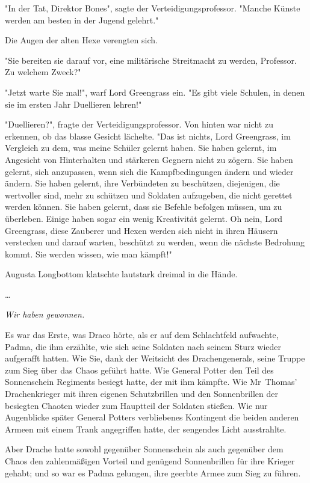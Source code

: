 {"In der Tat, Direktor Bones", sagte der Verteidigungsprofessor. "Manche Künste werden am besten in der Jugend gelehrt."

Die Augen der alten Hexe verengten sich.

"Sie bereiten sie darauf vor, eine militärische Streitmacht zu werden, Professor. Zu welchem Zweck?"

"Jetzt warte Sie mal!", warf Lord Greengrass ein. "Es gibt viele Schulen, in denen sie im ersten Jahr Duellieren lehren!"

"Duellieren?", fragte der Verteidigungsprofessor. Von hinten war nicht zu erkennen, ob das blasse Gesicht lächelte. "Das ist nichts, Lord Greengrass, im Vergleich zu dem, was meine Schüler gelernt haben. Sie haben gelernt, im Angesicht von Hinterhalten und stärkeren Gegnern nicht zu zögern. Sie haben gelernt, sich anzupassen, wenn sich die Kampfbedingungen ändern und wieder ändern. Sie haben gelernt, ihre Verbündeten zu beschützen, diejenigen, die wertvoller sind, mehr zu schützen und Soldaten aufzugeben, die nicht gerettet werden können. Sie haben gelernt, dass sie Befehle befolgen müssen, um zu überleben. Einige haben sogar ein wenig Kreativität gelernt. Oh nein, Lord Greengrass, diese Zauberer und Hexen werden sich nicht in ihren Häusern verstecken und darauf warten, beschützt zu werden, wenn die nächste Bedrohung kommt. Sie werden wissen, wie man kämpft!"

Augusta Longbottom klatschte lautstark dreimal in die Hände.

…

\emph{Wir haben gewonnen.}

Es war das Erste, was Draco hörte, als er auf dem Schlachtfeld aufwachte, Padma, die ihm erzählte, wie sich seine Soldaten nach seinem Sturz wieder aufgerafft hatten. Wie Sie, dank der Weitsicht des Drachengenerals, seine Truppe zum Sieg über das Chaos geführt hatte. Wie General Potter den Teil des Sonnenschein Regiments besiegt hatte, der mit ihm kämpfte. Wie Mr~Thomas' Drachenkrieger mit ihren eigenen Schutzbrillen und den Sonnenbrillen der besiegten Chaoten wieder zum Hauptteil der Soldaten stießen. Wie nur Augenblicke später General Potters verbliebenes Kontingent die beiden anderen Armeen mit einem Trank angegriffen hatte, der sengendes Licht ausstrahlte.

Aber Drache hatte sowohl gegenüber Sonnenschein als auch gegenüber dem Chaos den zahlenmäßigen Vorteil und genügend Sonnenbrillen für ihre Krieger gehabt; und so war es Padma gelungen, ihre geerbte Armee zum Sieg zu führen.

}
